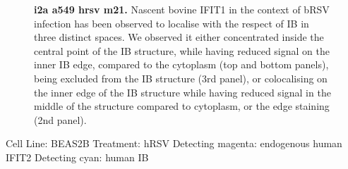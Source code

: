 \begin{figure}
\begin{subfigure}{1\textwidth}
    \end{subfigure}
    \caption[i2a a549 hrsv m21]{\textbf{i2a a549 hrsv m21.} Nascent bovine IFIT1 in the context of bRSV infection has been observed to localise with the respect of IB in three distinct spaces. We observed it either concentrated inside the central point of the IB structure, while having reduced signal on the inner IB edge, compared to the cytoplasm (top and bottom panels), being excluded from the IB structure (3rd panel), or colocalising on the inner edge of the IB structure while having reduced signal in the middle of the structure compared to cytoplasm, or the edge staining (2nd panel).}
    \label{fig:i2a a549 hrsv m21}
\end{figure}

Cell Line: BEAS2B \newline
Treatment: hRSV \newline
Detecting magenta: endogenous human IFIT2  \newline
Detecting cyan: human IB \newline

